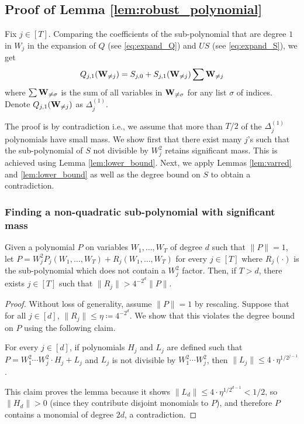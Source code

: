 		\subsection{Proof of Lemma \ref{lem:robust_polynomial}}

 Fix $j \in [T]$. Comparing the coefficients of the sub-polynomial that are degree $1$ in $W_j$ in the expansion of $Q$ (see  \eqref{eq:expand_Q}) and $US$ (see \eqref{eq:expand_S}), we get
		\begin{equation}							\label{eq:Delta}
			 Q_{j,1}({\bf W}_{\ne j}) = S_{j,0} + S_{j,1}({\bf W}_{\ne j})\sum {\bf W}_{\ne j}
		\end{equation}
where $\sum \mathbf{W}_{\neq\sigma}$ is the sum of all variables in $\mathbf{W}_{\neq\sigma}$ for any list $\sigma$ of indices.		
Denote $Q_{j,1}({\bf W}_{\ne j})$ as $\Delta^{(1)}_j$.

		
		The proof is by contradiction i.e., we assume that more than $T/2$ of the $\Delta^{(1)}_j$ polynomials have small mass. We show first that there exist many $j$'s such that the sub-polynomial of $S$ not divisible by $W_j^2$ retains significant mass. This is achieved using Lemma \ref{lem:lower_bound}. Next, we apply Lemmas \ref{lem:varred} and \ref{lem:lower_bound} as well as the degree bound on $S$ to obtain a contradiction.
	
	\subsubsection{Finding a non-quadratic sub-polynomial with significant mass}
	\begin{lemma}				\label{lem:lower_bound}
		Given a polynomial $P$ on variables $W_1,\ldots,W_T$ of degree $d$ such that $\|P\| = 1$,  let $P = W_j^2 P_j(W_1,\ldots,W_T) + R_j(W_1,\ldots,W_T)$ for every $j \in [T]$ where $R_j(\cdot)$ is the sub-polynomial which does not contain a $W_j^2$ factor. Then, if $T > d$, there exists $j \in [T]$ such that $\|R_j\| > 4^{-2^d}\|P\|$.
	\end{lemma}
	\begin{proof}
Without loss of generality, assume $\|P\| = 1$ by rescaling.
Suppose that for all $j \in [d]$, $\|R_j\| \leq \eta \coloneqq 4^{-2^d}$. We show that this violates the degree bound on $P$ using the following claim.
\begin{claim}\label{clm:deg}
For every $j \in [d]$, if polynomials $H_j$ and $L_j$ are defined such that $P = W_1^2 \cdots W_j^2 \cdot H_j + L_j$ and $L_j$ is not divisible by $W_1^2 \cdots W_j^2$, then $\|L_j\|\leq 4 \cdot \eta^{1/2^{j-1}}$.
\end{claim}
This claim proves the lemma because it shows $\|L_d\| \leq 4 \cdot \eta^{1/2^{d-1}} < 1/2$, so $\|H_d\|>0$ (since they contribute disjoint monomials to $P$), and therefore $P$ contains a monomial of degree $2d$, a contradiction.
	\end{proof}
	

